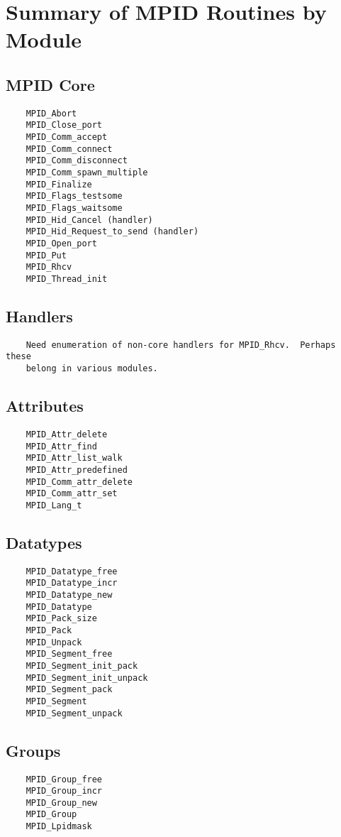 \documentclass{article}
\begin{document}
\section{Summary of MPID Routines by Module}

\subsection{MPID Core}
\begin{verbatim}
    MPID_Abort
    MPID_Close_port
    MPID_Comm_accept
    MPID_Comm_connect
    MPID_Comm_disconnect
    MPID_Comm_spawn_multiple
    MPID_Finalize
    MPID_Flags_testsome
    MPID_Flags_waitsome
    MPID_Hid_Cancel (handler)
    MPID_Hid_Request_to_send (handler)
    MPID_Open_port
    MPID_Put
    MPID_Rhcv
    MPID_Thread_init
\end{verbatim}

\subsection{Handlers}
\begin{verbatim}
    Need enumeration of non-core handlers for MPID_Rhcv.  Perhaps these 
    belong in various modules.
\end{verbatim}

\subsection{Attributes}
\begin{verbatim}
    MPID_Attr_delete
    MPID_Attr_find
    MPID_Attr_list_walk
    MPID_Attr_predefined
    MPID_Comm_attr_delete
    MPID_Comm_attr_set
    MPID_Lang_t
\end{verbatim}

\subsection{Datatypes}
\begin{verbatim}
    MPID_Datatype_free
    MPID_Datatype_incr
    MPID_Datatype_new
    MPID_Datatype
    MPID_Pack_size
    MPID_Pack
    MPID_Unpack
    MPID_Segment_free
    MPID_Segment_init_pack
    MPID_Segment_init_unpack
    MPID_Segment_pack
    MPID_Segment
    MPID_Segment_unpack
\end{verbatim}

\subsection{Groups}
\begin{verbatim}
    MPID_Group_free
    MPID_Group_incr
    MPID_Group_new
    MPID_Group
    MPID_Lpidmask
\end{verbatim}
\end{document}
